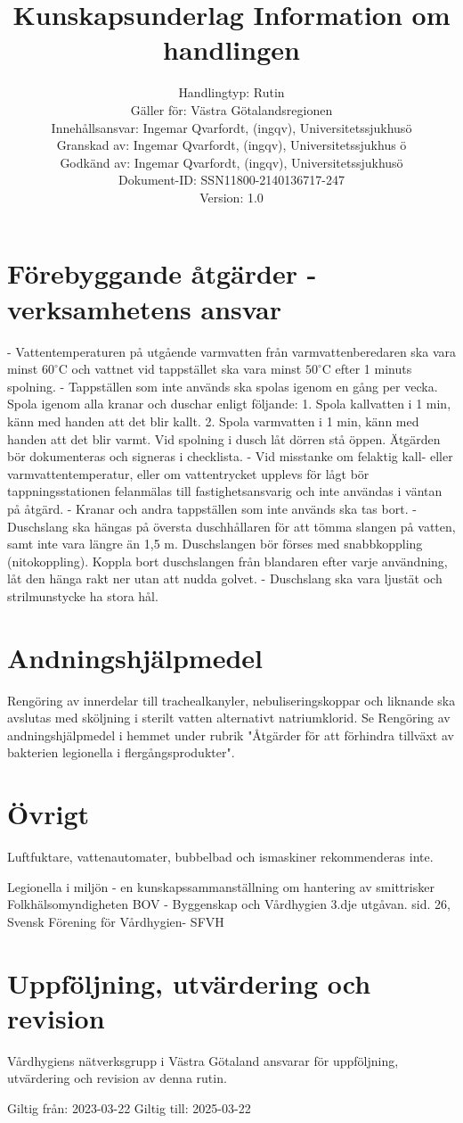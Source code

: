 \section*{Förebyggande åtgärder - verksamhetens ansvar}
- Vattentemperaturen på utgående varmvatten från varmvattenberedaren ska vara minst \(60^{\circ} \mathrm{C}\) och vattnet vid tappstället ska vara minst \(50^{\circ} \mathrm{C}\) efter 1 minuts spolning.
- Tappställen som inte används ska spolas igenom en gång per vecka. Spola igenom alla kranar och duschar enligt följande:
1. Spola kallvatten i 1 min, känn med handen att det blir kallt.
2. Spola varmvatten i 1 min, känn med handen att det blir varmt.
Vid spolning i dusch låt dörren stå öppen. Ätgärden bör dokumenteras och signeras i checklista.
- Vid misstanke om felaktig kall- eller varmvattentemperatur, eller om vattentrycket upplevs för lågt bör tappningsstationen felanmälas till fastighetsansvarig och inte användas i väntan på åtgärd.
- Kranar och andra tappställen som inte används ska tas bort.
- Duschslang ska hängas på översta duschhållaren för att tömma slangen på vatten, samt inte vara längre än 1,5 m. Duschslangen bör förses med snabbkoppling (nitokoppling). Koppla bort duschslangen från blandaren efter varje användning, låt den hänga rakt ner utan att nudda golvet.
- Duschslang ska vara ljustät och strilmunstycke ha stora hål.
\section*{Andningshjälpmedel}
Rengöring av innerdelar till trachealkanyler, nebuliseringskoppar och liknande ska avslutas med sköljning i sterilt vatten alternativt natriumklorid. Se Rengöring av andningshjälpmedel i hemmet under rubrik "Åtgärder för att förhindra tillväxt av bakterien legionella i flergångsprodukter".
\section*{Övrigt}
Luftfuktare, vattenautomater, bubbelbad och ismaskiner rekommenderas inte.

\title{
Kunskapsunderlag
}
Legionella i miljön - en kunskapssammanställning om hantering av smittrisker Folkhälsomyndigheten
BOV - Byggenskap och Vårdhygien 3.dje utgåvan. sid. 26, Svensk Förening för Vårdhygien- SFVH
\section*{Uppföljning, utvärdering och revision}
Vårdhygiens nätverksgrupp i Västra Götaland ansvarar för uppföljning, utvärdering och revision av denna rutin.

\title{
Information om handlingen
}
\author{
Handlingtyp: Rutin \\ Gäller för: Västra Götalandsregionen \\ Innehållsansvar: Ingemar Qvarfordt, (ingqv), Universitetssjukhusö \\ Granskad av: Ingemar Qvarfordt, (ingqv), Universitetssjukhus ö \\ Godkänd av: Ingemar Qvarfordt, (ingqv), Universitetssjukhusö \\ Dokument-ID: SSN11800-2140136717-247 \\ Version: 1.0
}
Giltig från: 2023-03-22
Giltig till: 2025-03-22